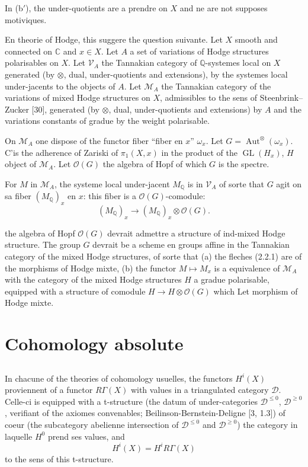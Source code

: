 \documentclass[11pt,a4paper]{article}
\theoremstyle{plain}
\theoremstyle{definition}
\DeclareMathOperator{\Aut}{Aut}
\DeclareMathOperator{\GL}{GL}
\newcommand{\Q}{\mathbb{Q}}
\newcommand{\C}{\mathbb{C}}
\begin{document}
In (b$'$), the under-quotients are a prendre on $X$ and ne are not supposes motiviques.

En theorie of Hodge, this suggere the question suivante. Let $X$ smooth and connected on $\C$ and $x \in X$. Let $A$ a set of variations of Hodge structures polarisables on $X$. Let $\mathscr{V}_A$ the Tannakian category of $\Q$-systemes local on $X$ generated (by $\otimes$, dual, under-quotients and extensions), by the systemes local under-jacents to the objects of $A$. Let $\mathcal{M}_A$ the Tannakian category of the variations of mixed Hodge structures on $X$, admissibles to the sens of Steenbrink--Zucker [30], generated (by $\otimes$, dual, under-quotients and extensions) by $A$ and the variations constants of gradue by the weight polarisable.

On $\mathcal{M}_A$ one dispose of the functor fiber ``fiber en $x$'' $\omega_x$. Let $G = \Aut^{\otimes}(\omega_x)$. C'is the adherence of Zariski of $\pi_1(X, x)$ in the product of the $\GL(H_x)$, $H$ object of $\mathcal{M}_A$. Let $\mathcal{O}(G)$ the algebra of Hopf of which $G$ is the spectre.

For $M$ in $\mathcal{M}_A$, the systeme local under-jacent $M_{\Q}$ is in $\mathscr{V}_A$ of sorte that $G$ agit on sa fiber $(M_{\Q})_x$ en $x$: this fiber is a $\mathcal{O}(G)$-comodule:
\begin{equation}
\tag{2.2.1}
(M_{\Q})_x \to (M_{\Q})_x \otimes \mathcal{O}(G).
\end{equation}

the algebra of Hopf $\mathcal{O}(G)$ devrait admettre a structure of ind-mixed Hodge structure. The group $G$ devrait be a scheme en groups affine in the Tannakian category of the mixed Hodge structures, of sorte that (a) the fleches (2.2.1) are of the morphisms of Hodge mixte, (b) the functor $M \mapsto M_x$ is a equivalence of $\mathcal{M}_A$ with the category of the mixed Hodge structures $H$ a gradue polarisable, equipped with a structure of comodule $H \to H \otimes \mathcal{O}(G)$ which Let morphism of Hodge mixte.


\section{Cohomology absolute}

\subsection{}

In chacune of the theories of cohomology usuelles, the functors $H^i(X)$ proviennent of a functor $R\Gamma(X)$ with values in a triangulated category $\mathscr{D}$. Celle-ci is equipped with a t-structure (the datum of under-categories $\mathscr{D}^{\leq 0}$, $\mathscr{D}^{\geq 0}$, verifiant of the axiomes convenables; Beilinson-Bernstein-Deligne [3, 1.3]) of coeur (the subcategory abelienne intersection of $\mathscr{D}^{\leq 0}$ and $\mathscr{D}^{\geq 0}$) the category in laquelle $H^0$ prend ses values, and
$$
H^i(X) = H^i R\Gamma(X)
$$
to the sens of this t-structure.
\end{document}

